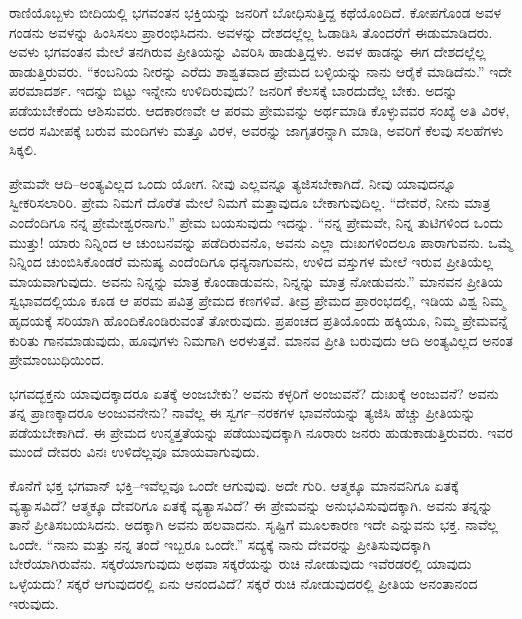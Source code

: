 ರಾಣಿಯೊಬ್ಬಳು ಬೀದಿಯಲ್ಲಿ ಭಗವಂತನ ಭಕ್ತಿಯನ್ನು ಜನರಿಗೆ ಬೋಧಿಸುತ್ತಿದ್ದ ಕಥೆಯೊಂದಿದೆ. ಕೋಪಗೊಂಡ ಅವಳ ಗಂಡನು ಅವಳನ್ನು ಹಿಂಸಿಸಲು ಪ್ರಾರಂಭಿಸಿದನು. ಅವಳನ್ನು ದೇಶದಲ್ಲೆಲ್ಲ ಓಡಾಡಿಸಿ ತೊಂದರೆಗೆ ಈಡುಮಾಡಿದರು. ಅವಳು ಭಗವಂತನ ಮೇಲೆ ತನಗಿರುವ ಪ್ರೀತಿಯನ್ನು ವಿವರಿಸಿ ಹಾಡುತ್ತಿದ್ದಳು. ಅವಳ ಹಾಡನ್ನು ಈಗ ದೇಶದಲ್ಲೆಲ್ಲ ಹಾಡುತ್ತಿರುವರು. “ಕಂಬನಿಯ ನೀರನ್ನು ಎರೆದು ಶಾಶ್ವತವಾದ ಪ್ರೇಮದ ಬಳ್ಳಿಯನ್ನು ನಾನು ಆರೈಕೆ ಮಾಡಿದೆನು.” ಇದೇ ಪರಮಾದರ್ಶ. ಇದನ್ನು ಬಿಟ್ಟು ಇನ್ನೇನು ಉಳಿದಿರುವುದು? ಜನರಿಗೆ ಕೆಲಸಕ್ಕೆ ಬಾರದುದೆಲ್ಲ ಬೇಕು. ಅದನ್ನು ಪಡೆಯಬೇಕೆಂದು ಆಶಿಸುವರು. ಆದಕಾರಣವೇ ಆ ಪರಮ ಪ್ರೇಮವನ್ನು ಅರ್ಥಮಾಡಿ ಕೊಳ್ಳುವವರ ಸಂಖ್ಯೆ ಅತಿ ವಿರಳ, ಅದರ ಸಮೀಪಕ್ಕೆ ಬರುವ ಮಂದಿಗಳು ಮತ್ತೂ ವಿರಳ, ಅವರನ್ನು ಜಾಗೃತರನ್ನಾಗಿ ಮಾಡಿ, ಅವರಿಗೆ ಕೆಲವು ಸಲಹೆಗಳು ಸಿಕ್ಕಲಿ.

ಪ್ರೇಮವೇ ಆದಿ–ಅಂತ್ಯವಿಲ್ಲದ ಒಂದು ಯೋಗ. ನೀವು ಎಲ್ಲವನ್ನೂ ತ್ಯಜಿಸಬೇಕಾಗಿದೆ. ನೀವು ಯಾವುದನ್ನೂ ಸ್ವೀಕರಿಸಲಾರಿರಿ. ಪ್ರೇಮ ನಿಮಗೆ ದೊರೆತ ಮೇಲೆ ನಿಮಗೆ ಮತ್ತಾವುದೂ ಬೇಕಾಗುವುದಿಲ್ಲ. “ದೇವರೆ, ನೀನು ಮಾತ್ರ ಎಂದೆಂದಿಗೂ ನನ್ನ ಪ್ರೇಮೇಶ್ವರನಾಗು.” ಪ್ರೇಮ ಬಯಸುವುದು ಇದನ್ನು. “ನನ್ನ ಪ್ರೇಮವೇ, ನಿನ್ನ ತುಟಿಗಳಿಂದ ಒಂದು ಮುತ್ತು! ಯಾರು ನಿನ್ನಿಂದ ಆ ಚುಂಬನವನ್ನು ಪಡೆದಿರುವನೊ, ಅವನು ಎಲ್ಲಾ ದುಃಖಗಳಿಂದಲೂ ಪಾರಾಗುವನು. ಒಮ್ಮೆ ನಿನ್ನಿಂದ ಚುಂಬಿಸಿಕೊಂಡರೆ ಮನುಷ್ಯ ಎಂದೆಂದಿಗೂ ಧನ್ಯನಾಗುವನು, ಉಳಿದ ವಸ್ತುಗಳ ಮೇಲೆ ಇರುವ ಪ್ರೀತಿಯೆಲ್ಲ ಮಾಯವಾಗುವುದು. ಅವನು ನಿನ್ನನ್ನು ಮಾತ್ರ ಕೊಂಡಾಡುವನು, ನಿನ್ನನ್ನು ಮಾತ್ರ ನೋಡುವನು.” ಮಾನವನ ಪ್ರೀತಿಯ ಸ್ವಭಾವದಲ್ಲಿಯೂ ಕೂಡ ಆ ಪರಮ ಪವಿತ್ರ ಪ್ರೇಮದ ಕಣಗಳಿವೆ. ತೀವ್ರ ಪ್ರೇಮದ ಪ್ರಾರಂಭದಲ್ಲಿ, ಇಡಿಯ ವಿಶ್ವ ನಿಮ್ಮ ಹೃದಯಕ್ಕೆ ಸರಿಯಾಗಿ ಹೊಂದಿಕೊಂಡಿರುವಂತೆ ತೋರುವುದು. ಪ್ರಪಂಚದ ಪ್ರತಿಯೊಂದು ಹಕ್ಕಿಯೂ, ನಿಮ್ಮ ಪ್ರೇಮವನ್ನೆ ಕುರಿತು ಗಾನಮಾಡುವುದು, ಹೂವುಗಳು ನಿಮಗಾಗಿ ಅರಳುತ್ತವೆ. ಮಾನವ ಪ್ರೀತಿ ಬರುವುದು ಆದಿ ಅಂತ್ಯವಿಲ್ಲದ ಅನಂತ ಪ್ರೇಮಾಂಬುಧಿಯಿಂದ.

\newpage

ಭಗವದ್ಭಕ್ತನು ಯಾವುದಕ್ಕಾದರೂ ಏತಕ್ಕೆ ಅಂಜಬೇಕು? ಅವನು ಕಳ್ಳರಿಗೆ ಅಂಜುವನೆ? ದುಃಖಕ್ಕೆ ಅಂಜುವನೆ? ಅವನು ತನ್ನ ಪ್ರಾಣಕ್ಕಾದರೂ ಅಂಜುವನೇನು? ನಾವೆಲ್ಲ ಈ ಸ್ವರ್ಗ–ನರಕಗಳ ಭಾವನೆಯನ್ನು ತ್ಯಜಿಸಿ ಹೆಚ್ಚು ಪ್ರೀತಿಯನ್ನು ಪಡೆಯಬೇಕಾಗಿದೆ. ಈ ಪ್ರೇಮದ ಉನ್ಮತ್ತತೆಯನ್ನು ಪಡೆಯುವುದಕ್ಕಾಗಿ ನೂರಾರು ಜನರು ಹುಡುಕಾಡುತ್ತಿರುವರು. ಇವರ ಮುಂದೆ ದೇವರು ವಿನಃ ಉಳಿದೆಲ್ಲವೂ ಮಾಯವಾಗುವುದು.

\vskip 2pt

ಕೊನೆಗೆ ಭಕ್ತ ಭಗವಾನ್ ಭಕ್ತಿ–ಇವೆಲ್ಲವೂ ಒಂದೇ ಆಗುವುವು. ಅದೇ ಗುರಿ. ಆತ್ಮಕ್ಕೂ ಮಾನವನಿಗೂ ಏತಕ್ಕೆ ವ್ಯತ್ಯಾಸವಿದೆ? ಆತ್ಮಕ್ಕೂ ದೇವರಿಗೂ ಏತಕ್ಕೆ ವ್ಯತ್ಯಾಸವಿದೆ? ಈ ಪ್ರೇಮವನ್ನು ಅನುಭವಿಸುವುದಕ್ಕಾಗಿ. ಅವನು ತನ್ನನ್ನು ತಾನೆ ಪ್ರೀತಿಸಬಯಸಿದನು. ಅದಕ್ಕಾಗಿ ಅವನು ಹಲವಾದನು. ಸೃಷ್ಟಿಗೆ ಮೂಲಕಾರಣ ಇದೇ ಎನ್ನುವನು ಭಕ್ತ. ನಾವೆಲ್ಲ ಒಂದೇ. “ನಾನು ಮತ್ತು ನನ್ನ ತಂದೆ ಇಬ್ಬರೂ ಒಂದೇ.” ಸದ್ಯಕ್ಕೆ ನಾನು ದೇವರನ್ನು ಪ್ರೀತಿಸುವುದಕ್ಕಾಗಿ ಬೇರೆಯಾಗಿರುವೆನು. ಸಕ್ಕರೆಯಾಗುವುದು ಅಥವಾ ಸಕ್ಕರೆಯನ್ನು ರುಚಿ ನೋಡುವುದು ಇವೆರಡರಲ್ಲಿ ಯಾವುದು ಒಳ್ಳೆಯದು? ಸಕ್ಕರೆ ಆಗುವುದರಲ್ಲಿ ಏನು ಆನಂದವಿದೆ? ಸಕ್ಕರೆ ರುಚಿ ನೋಡುವುದರಲ್ಲಿ ಪ್ರೀತಿಯ ಅನಂತಾನಂದ ಇರುವುದು.

\vskip 2pt


